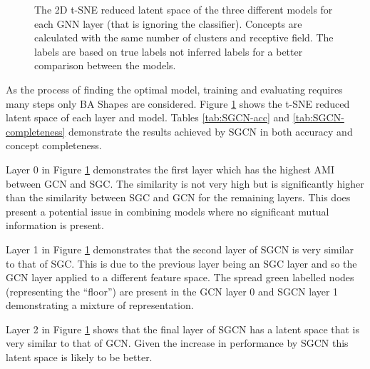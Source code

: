 \begin{figure}
    \caption{The 2D t-SNE reduced latent space of the three different models for each GNN layer (that is ignoring the classifier). Concepts are calculated with the same number of clusters and receptive field. The labels are based on true labels not inferred labels for a better comparison between the models.}
    \label{fig:SGCN-latent-spaces}
\end{figure}




As the process of finding the optimal model, training and evaluating requires many steps only BA Shapes are considered.
Figure \ref{fig:SGCN-latent-spaces} shows the t-SNE reduced latent space of each layer and model.
Tables \ref{tab:SGCN-acc} and \ref{tab:SGCN-completeness} demonstrate the results achieved by SGCN in both accuracy and concept completeness.

Layer 0 in Figure \ref{fig:SGCN-latent-spaces} demonstrates the first layer which has the highest AMI between GCN and SGC.
The similarity is not very high but is significantly higher than the similarity between SGC and GCN for the remaining layers.
This does present a potential issue in combining models where no significant mutual information is present.

Layer 1 in Figure \ref{fig:SGCN-latent-spaces} demonstrates that the second layer of SGCN is very similar to that of SGC.
This is due to the previous layer being an SGC layer and so the GCN layer applied to a different feature space.
The spread green labelled nodes (representing the ``floor'') are present in the GCN layer 0 and SGCN layer 1 demonstrating a mixture of representation.

Layer 2 in Figure \ref{fig:SGCN-latent-spaces} shows that the final layer of SGCN has a latent space that is very similar to that of GCN.
Given the increase in performance by SGCN this latent space is likely to be better.

